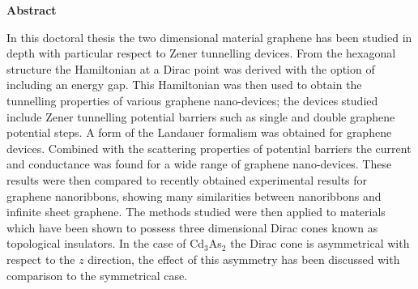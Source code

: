 %
\thispagestyle{plain}
\begin{center}
	\Large
	\textbf{Abstract}
\end{center}
	In this doctoral thesis the two dimensional material graphene has been studied in depth with particular respect to Zener tunnelling devices. From the hexagonal structure the Hamiltonian at a Dirac point was derived with the option of including an energy gap. This Hamiltonian was then used to obtain the tunnelling properties of various graphene nano-devices; the devices studied include Zener tunnelling potential barriers such as single and double graphene potential steps. A form of the Landauer formalism was obtained for graphene devices. Combined with the scattering properties of potential barriers the current and conductance was found for a wide range of graphene nano-devices. These results were then compared to recently obtained experimental results for graphene nanoribbons, showing many similarities between nanoribbons and infinite sheet graphene. The methods studied were then applied to materials which have been shown to possess three dimensional Dirac cones known as topological insulators. In the case of Cd$_{3}$As$_{2}$ the Dirac cone is asymmetrical with respect to the $z$ direction, the effect of this asymmetry has been discussed with comparison to the symmetrical case.
%
